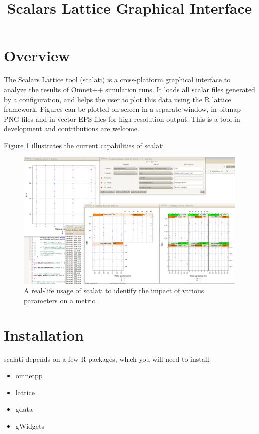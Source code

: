 \title{Scalars Lattice Graphical Interface}


\section{Overview}

The Scalars Lattice tool (scalati) is a cross-platform graphical interface to analyze the results of Omnet++ simulation runs. It loads all scalar files generated by a configuration, and helps the user to plot this data using the R lattice framework. Figures can be plotted on screen in a separate window, in bitmap PNG files and in vector EPS files for high resolution output. This is a tool in development and contributions are welcome.

Figure \ref{fig:scalati-complex} illustrates the current capabilities of scalati.

%
\begin{figure}[tbh]
\includegraphics[width=1\columnwidth]{figures/scalati/scalati-complex_scenario.png}

\caption{\label{fig:scalati-complex}A real-life usage of scalati to identify the impact of various parameters on a metric.}

\end{figure}


\section{Installation}

scalati depends on a few R packages, which you will need to install:

\begin{itemize}
\item omnetpp
\item lattice
\item gdata
\item gWidgets
\end{itemize}

